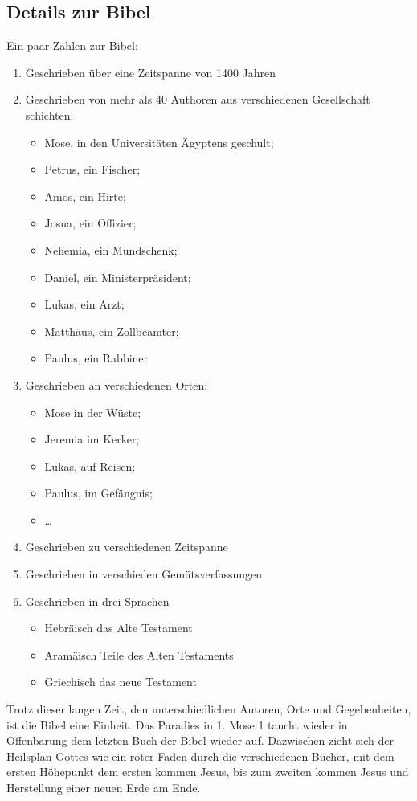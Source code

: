 \subsection{Details zur Bibel}
Ein paar Zahlen zur Bibel:
\begin{enumerate}
    \item Geschrieben über eine Zeitspanne von 1400 Jahren
    \item Geschrieben von mehr als 40 Authoren aus verschiedenen Gesellschaft schichten:
    \begin{itemize}
        \item Mose, in den Universitäten Ägyptens geschult;
        \item Petrus, ein Fischer;
        \item Amos, ein Hirte;
        \item Josua, ein Offizier;
        \item Nehemia, ein Mundschenk;
        \item Daniel, ein Ministerpräsident;
        \item Lukas, ein Arzt;
        \item Matthäus, ein Zollbeamter;
        \item Paulus, ein Rabbiner
    \end{itemize}
    \item Geschrieben an verschiedenen Orten:
    \begin{itemize}
        \item Mose in der Wüste;
        \item Jeremia im Kerker;
        \item Lukas, auf Reisen;
        \item Paulus, im Gefängnis;
        \item \dots
    \end{itemize}
    \item Geschrieben zu verschiedenen Zeitspanne
    \item Geschrieben in verschieden Gemütsverfassungen
    \item Geschrieben in drei Sprachen
    \begin{itemize}
        \item Hebräisch das Alte Testament
        \item Aramäisch Teile des Alten Testaments
        \item Griechisch das neue Testament
    \end{itemize}    
\end{enumerate}
Trotz dieser langen Zeit, den unterschiedlichen Autoren, Orte und Gegebenheiten, ist die Bibel eine Einheit. Das Paradies in 1. Mose 1 taucht wieder in Offenbarung dem letzten Buch der Bibel wieder auf. Dazwischen zieht sich der Heilsplan Gottes wie ein roter Faden durch die verschiedenen Bücher, mit dem ersten Höhepunkt dem ersten kommen Jesus, bis zum zweiten kommen Jesus und Herstellung einer neuen Erde am Ende.

